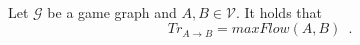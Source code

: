 {}
\begin{theorem} \ \\
   \label{trustflow}
   Let $\mathcal{G}$ be a game graph and $A, B \in \mathcal{V}$. It holds that
   \begin{equation*}
      Tr_{A \rightarrow B} = maxFlow\left(A, B\right) \enspace.
   \end{equation*}
\end{theorem}

